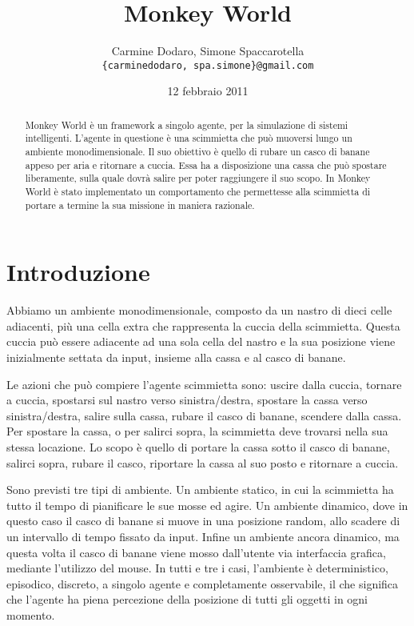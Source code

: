 \documentclass[a4paper,10pt]{article}
\title{\Huge{\textbf{Monkey World}}}
\author{
    Carmine Dodaro, Simone Spaccarotella \\
    \texttt{\small{\{carminedodaro, spa.simone\}@gmail.com}}
}
\date{12 febbraio 2011}
\begin{document}
    \maketitle

    \begin{abstract}
	Monkey World è un framework a singolo agente, per la simulazione di sistemi intelligenti. L'agente
	in questione è una scimmietta che può muoversi lungo un ambiente monodimensionale. Il suo obiettivo è quello di rubare un
	casco di banane appeso per aria e ritornare a cuccia. Essa ha a disposizione una cassa che può spostare liberamente, sulla quale dovrà salire per poter
	raggiungere il suo scopo. In Monkey World è stato implementato un comportamento che permettesse alla scimmietta di portare a termine
	la sua missione in maniera razionale.
    \end{abstract}

    \section{Introduzione}
	Abbiamo un ambiente monodimensionale, composto da un nastro di dieci celle adiacenti, più una cella extra che
	rappresenta la cuccia della scimmietta. Questa cuccia può essere adiacente ad una sola cella del nastro e la sua
	posizione viene inizialmente settata da input, insieme alla cassa e al casco di banane.
	
	Le azioni che può compiere l'agente scimmietta sono: uscire dalla cuccia, tornare a cuccia,
	spostarsi sul nastro verso sinistra/destra, spostare la cassa verso sinistra/destra, salire sulla cassa,
	rubare il casco di banane, scendere dalla cassa. Per spostare la cassa, o per salirci sopra, la scimmietta deve trovarsi
	nella sua stessa locazione. Lo scopo è quello di portare la cassa sotto il casco di banane, salirci sopra, rubare il casco, 
	riportare la cassa al suo posto e ritornare a cuccia.
	
	Sono previsti tre tipi di ambiente. Un ambiente statico, in cui la scimmietta ha tutto il tempo di pianificare le sue mosse
	ed agire. Un ambiente dinamico, dove in questo caso il casco di banane si muove in una posizione random, allo scadere di un intervallo di tempo fissato
	da input. Infine un ambiente ancora dinamico, ma questa volta il casco di banane viene mosso dall'utente via interfaccia grafica, mediante
	l'utilizzo del mouse. In tutti e tre i casi, l'ambiente è deterministico, episodico, discreto, a singolo agente e completamente osservabile,
	il che significa che l'agente ha piena percezione della posizione di tutti gli oggetti in ogni momento.
	
\end{document}
